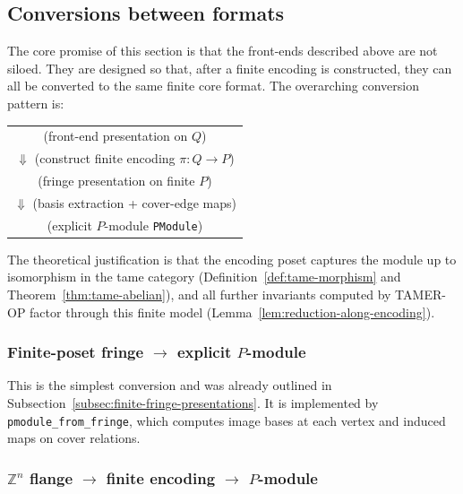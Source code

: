 \documentclass{article}
\newcommand{\<}{\langle}
\renewcommand{\>}{\rangle}
\theoremstyle{definition}
\theoremstyle{remark}
\begin{document}
	\subsection{Conversions between formats}\label{subsec:format-conversions}
	
	The core promise of this section is that the front-ends described above are not siloed.
	They are designed so that, after a finite encoding is constructed, they can all be converted to the same finite core
	format.  The overarching conversion pattern is:
	
	\begin{center}
		\begin{tabular}{c}
			(front-end presentation on $Q$)\\
			$\Downarrow$ (construct finite encoding $\pi\colon Q\to P$)\\
			(fringe presentation on finite $P$)\\
			$\Downarrow$ (basis extraction + cover-edge maps)\\
			(explicit $P$-module \texttt{PModule})
		\end{tabular}
	\end{center}
	
	The theoretical justification is that the encoding poset captures the module up to isomorphism in the tame category
	(Definition~\ref{def:tame-morphism} and Theorem~\ref{thm:tame-abelian}), and all further invariants computed by TAMER-OP
	factor through this finite model (Lemma~\ref{lem:reduction-along-encoding}).
	
	\subsubsection*{Finite-poset fringe $\to$ explicit $P$-module}
	
	This is the simplest conversion and was already outlined in Subsection~\ref{subsec:finite-fringe-presentations}.
	It is implemented by \texttt{pmodule\_from\_fringe}, which computes image bases at each vertex and induced maps on cover
	relations.
	
	\subsubsection*{$\mathbb{Z}^n$ flange $\to$ finite encoding $\to$ $P$-module}
	
\end{document}
